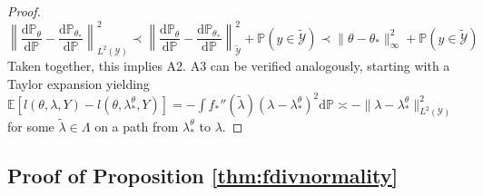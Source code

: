 \documentclass[12pt]{article}
\def\D{\mathrm{d}}
\theoremstyle{myplain}
\theoremstyle{definition}
\theoremstyle{definition}
\theoremstyle{remark}
\numberwithin{equation}{section}
\begin{document}
\begin{proof}
$$\left\|\frac{\D\mathbb{P}_\theta}{\D\mathbb{P}}-\frac{\D\mathbb{P}_{\theta_*}}{\D\mathbb{P}}\right\|_{L^2(\mathcal{Y})}^2 \prec \left\|\frac{\D\mathbb{P}_\theta}{\D\mathbb{P}}-\frac{\D\mathbb{P}_{\theta_*}}{\D\mathbb{P}}\right\|_{\widetilde{\mathcal{Y}}}^2 + \mathbb{P}(y\in\widetilde{\mathcal{Y}})\prec \|\theta-\theta_*\|_\infty^2+ \mathbb{P}(y\in\widetilde{\mathcal{Y}})$$
Taken together, this implies A2. A3 can be verified analogously, starting with a Taylor expansion yielding $\mathbb{E}[l(\theta, \lambda, Y)-l(\theta, \lambda_*^\theta, Y)]=-\int f_*''(\widetilde{\lambda})(\lambda-\lambda_*^\theta)^2\D\mathbb{P} \asymp - \|\lambda-\lambda_*^\theta\|^2_{L^2(\mathcal{Y})}$ for some $\widetilde{\lambda}\in\Lambda$ on a path from $\lambda_*^\theta$ to $\lambda$.
\end{proof}
\subsection{Proof of Proposition \ref{thm:fdivnormality}}
\end{document}
